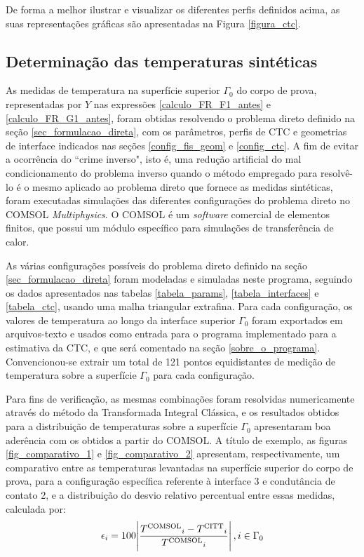 De forma a melhor ilustrar e visualizar os diferentes perfis definidos acima, as suas representações gráficas são apresentadas na Figura \ref{figura_ctc}.
\newpage



\subsection{Determinação das temperaturas sintéticas}

As medidas de temperatura na superfície superior $\Gamma_0$ do corpo de prova, representadas por $Y$ nas expressões \eqref{calculo_FR_F1_antes} e \eqref{calculo_FR_G1_antes}, foram obtidas resolvendo o problema direto definido na seção \ref{sec_formulacao_direta}, com os parâmetros, perfis de CTC e geometrias de interface indicados nas seções \ref{config_fis_geom} e \ref{config_ctc}. A fim de evitar a ocorrência do ``crime inverso", isto é, uma redução artificial do mal condicionamento do problema inverso quando o método empregado para resolvê-lo é o mesmo aplicado ao problema direto que fornece as medidas sintéticas\citep{livro_kaipio}, foram executadas simulações das diferentes configurações do problema direto no COMSOL \textit{Multiphysics}\textsuperscript{\textregistered}. O COMSOL é um \textit{software} comercial de elementos finitos, que possui um módulo específico para simulações de transferência de calor.

As várias configurações possíveis do problema direto definido na seção \ref{sec_formulacao_direta} foram modeladas e simuladas neste programa, seguindo os dados apresentados nas tabelas \ref{tabela_params}, \ref{tabela_interfaces} e \ref{tabela_ctc}, usando uma malha triangular extrafina. Para cada configuração, os valores de temperatura ao longo da interface superior $\Gamma_0$ foram exportados em arquivos-texto e usados como entrada para o programa implementado para a estimativa da CTC, e que será comentado na seção \ref{sobre_o_programa}. Convencionou-se extrair um total de 121 pontos equidistantes de medição de temperatura sobre a superfície $\Gamma_0$ para cada configuração.

Para fins de verificação, as mesmas combinações foram resolvidas numericamente através do método da Transformada Integral Clássica, e os resultados obtidos para a distribuição de temperaturas sobre a superfície $\Gamma_0$ apresentaram boa aderência com os obtidos a partir do COMSOL. A título de exemplo, as figuras \ref{fig_comparativo_1} e \ref{fig_comparativo_2} apresentam, respectivamente, um comparativo entre as temperaturas levantadas na superfície superior do corpo de prova, para a configuração específica referente à interface 3 e condutância de contato 2, e a distribuição do desvio relativo percentual entre essas medidas, calculada por:
\begin{align}
\epsilon_i = 100\abs{\frac{T\textsuperscript{COMSOL}_i - T\textsuperscript{CITT}_i}{T\textsuperscript{COMSOL}_i}}, i \in \Gamma_0
\end{align}

